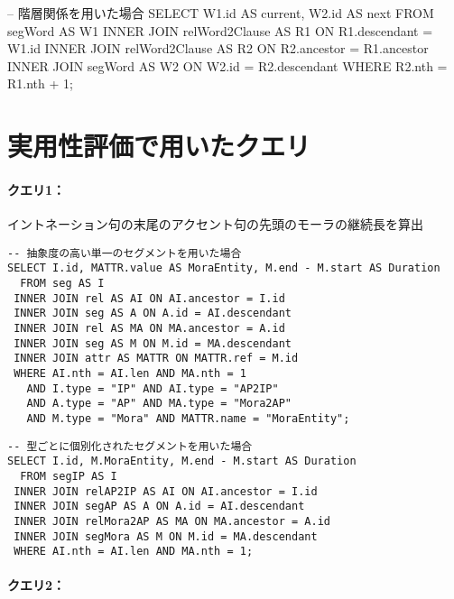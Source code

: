 \documentclass[japanese]{jnlp_1.4}
\newenvironment{query}{}{}
\begin{document}
\begin{query}
-- 階層関係を用いた場合
SELECT W1.id AS current, W2.id AS next
  FROM segWord AS W1
 INNER JOIN relWord2Clause AS R1 ON R1.descendant = W1.id
 INNER JOIN relWord2Clause AS R2 ON R2.ancestor = R1.ancestor
 INNER JOIN segWord AS W2 ON W2.id = R2.descendant
 WHERE R2.nth = R1.nth + 1;
\end{query}

\section{実用性評価で用いたクエリ}
\label{sec:ex}

\paragraph{クエリ1：}

イントネーション句の末尾のアクセント句の先頭のモーラの継続長を算出

\begin{screen}\small
\renewcommand\baselinestretch{0.8}
\begin{verbatim}
-- 抽象度の高い単一のセグメントを用いた場合
SELECT I.id, MATTR.value AS MoraEntity, M.end - M.start AS Duration
  FROM seg AS I
 INNER JOIN rel AS AI ON AI.ancestor = I.id
 INNER JOIN seg AS A ON A.id = AI.descendant
 INNER JOIN rel AS MA ON MA.ancestor = A.id
 INNER JOIN seg AS M ON M.id = MA.descendant
 INNER JOIN attr AS MATTR ON MATTR.ref = M.id
 WHERE AI.nth = AI.len AND MA.nth = 1
   AND I.type = "IP" AND AI.type = "AP2IP"
   AND A.type = "AP" AND MA.type = "Mora2AP"
   AND M.type = "Mora" AND MATTR.name = "MoraEntity";
\end{verbatim}
\end{screen}

\begin{screen}\small
\renewcommand\baselinestretch{0.8}
\begin{verbatim}
-- 型ごとに個別化されたセグメントを用いた場合
SELECT I.id, M.MoraEntity, M.end - M.start AS Duration
  FROM segIP AS I
 INNER JOIN relAP2IP AS AI ON AI.ancestor = I.id
 INNER JOIN segAP AS A ON A.id = AI.descendant
 INNER JOIN relMora2AP AS MA ON MA.ancestor = A.id
 INNER JOIN segMora AS M ON M.id = MA.descendant
 WHERE AI.nth = AI.len AND MA.nth = 1;
\end{verbatim}
\end{screen}

\vspace{.5\baselineskip}
\paragraph{クエリ2：}
\end{document}
